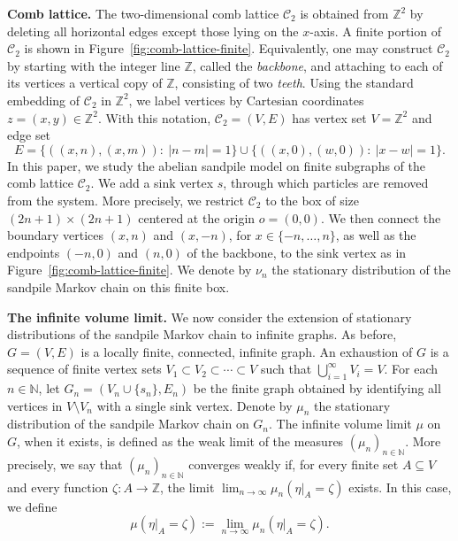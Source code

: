 \documentclass[11pt]{article}
\begin{document}
\textbf{Comb lattice.}
The two-dimensional comb lattice $\mathcal{C}_2$ is obtained from $\mathbb{Z}^2$ by deleting all horizontal edges except those lying on the $x$-axis. A finite portion of $\mathcal{C}_2$ is shown in Figure~\ref{fig:comb-lattice-finite}. Equivalently, one may construct $\mathcal{C}_2$ by starting with the integer line $\mathbb{Z}$, called the \textit{backbone}, and attaching to each of its vertices a vertical copy of $\mathbb{Z}$, consisting of two \textit{teeth}. 
Using the standard embedding of $\mathcal{C}_2$ in $\mathbb{Z}^2$, we label vertices by Cartesian coordinates $z=(x,y)\in\mathbb{Z}^2$. With this notation, $\mathcal{C}_2=(V,E)$ has vertex set $V=\mathbb{Z}^2$ and edge set
\[
E=\{((x,n),(x,m)):\ |n-m|=1\}\cup\{((x,0),(w,0)):\ |x-w|=1\}.
\]
In this paper, we study the abelian sandpile model on finite subgraphs of the comb lattice $\mathcal{C}_2$. We add a sink vertex $s$, through which particles are removed from the system. More precisely, we restrict $\mathcal{C}_2$ to the box of size $(2n+1)\times(2n+1)$ centered at the origin $o=(0,0)$. We then connect the boundary vertices $(x,n)$ and $(x,-n)$, for $x\in\{-n,\ldots,n\}$, as well as the endpoints $(-n,0)$ and $(n,0)$ of the backbone, to the sink vertex as in Figure~\ref{fig:comb-lattice-finite}. We denote by $\nu_n$ the stationary distribution of the sandpile Markov chain on this finite box.

\textbf{The infinite volume limit.}
We now consider the extension of stationary distributions of the sandpile Markov chain to infinite graphs. As before, $G=(V,E)$ is a locally finite, connected, infinite graph. An exhaustion of $G$ is a sequence of finite vertex sets 
$V_1\subset V_2\subset \cdots \subset V$
such that $\bigcup_{i=1}^\infty V_i=V$. For each $n\in\mathbb{N}$, let $G_n=(V_n\cup\{s_n\},E_n)$ be the finite graph obtained by identifying all vertices in $V\setminus V_n$ with a single sink vertex. Denote by $\mu_n$ the stationary distribution of the sandpile Markov chain on $G_n$. 
The infinite volume limit $\mu$ on $G$, when it exists, is defined as the weak limit of the measures $(\mu_n)_{n\in\mathbb{N}}$. More precisely, we say that $(\mu_n)_{n\in\mathbb{N}}$ converges weakly if, for every finite set $A\subseteq V$ and every function $\zeta:A\to\mathbb{Z}$, the limit 
$\lim_{n\to\infty}\mu_n(\eta|_A=\zeta)$
exists. In this case, we define
\[
\mu(\eta|_A=\zeta)
:=
\lim_{n\to\infty}\mu_n(\eta|_A=\zeta).
\]
\end{document}
